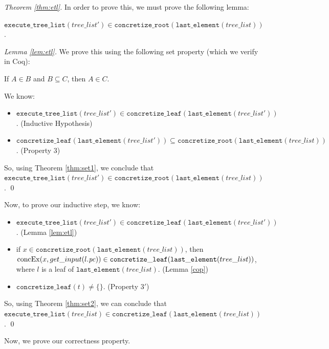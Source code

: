 \begin{proof}[Theorem \ref{thm:etl}]
In order to prove this, we must prove the following lemma:
\begin{lemma} 
\label{lem:etl}
$\mathtt{execute\_tree\_list} (tree\_list') \in \mathtt{concretize\_root} (\mathtt{last\_element} (tree\_list))$.
\end{lemma}
\begin{proof}[Lemma \ref{lem:etl}]
We prove this using the following set property (which we verify in Coq):

\begin{theorem} \label{thm:set1}
If $A \in B$ and $B \subseteq C$, then $A \in C$.
\end{theorem}

We know:
\begin{itemize}
\item$ \mathtt{execute\_tree\_list}(tree\_list') \in
        \mathtt{concretize\_leaf} (\mathtt{last\_element}(tree\_list')) $. (Inductive Hypothesis)
\item 
$\mathtt{concretize\_leaf} (\mathtt{last\_element}(tree\_list')) \subseteq \mathtt{concretize\_root} (\mathtt{last\_element} (tree\_list))$. (Property $3$)
 \end{itemize}
 
 So, using Theorem \ref{thm:set1}, we conclude that $\mathtt{execute\_tree\_list} (tree\_list') \in \mathtt{concretize\_root} (\mathtt{last\_element} (tree\_list))$. \qed
\end{proof}

Now, to prove our inductive step, we know:
\begin{itemize}
\item $\mathtt{execute\_tree\_list} (tree\_list') \in \mathtt{concretize\_leaf} (\mathtt{last\_element}(tree\_list'))$. (Lemma \ref{lem:etl})
\item if $x \in \mathtt{concretize\_root}(\mathtt{last\_element}(tree\_list))$, then  $\mathrm{concEx}(x, get\_input (l.\mathit{pc})) \in \mathtt{concretize\_leaf}(\mathtt{last\_element}(tree\_list))$,
where $l$ is a leaf of $\mathtt{last\_element}(tree\_list)$. (Lemma \ref{cop})
\item $\mathtt{concretize\_leaf}(t) \neq \{\} $. (Property $3'$)
\end{itemize}

So, using Theorem \ref{thm:set2}, we can conclude that $\mathtt{execute\_tree\_list} (tree\_list) \in \mathtt{concretize\_leaf} (\mathtt{last\_element}(tree\_list))$. \qed
\end{proof}

Now, we prove our correctness property.

